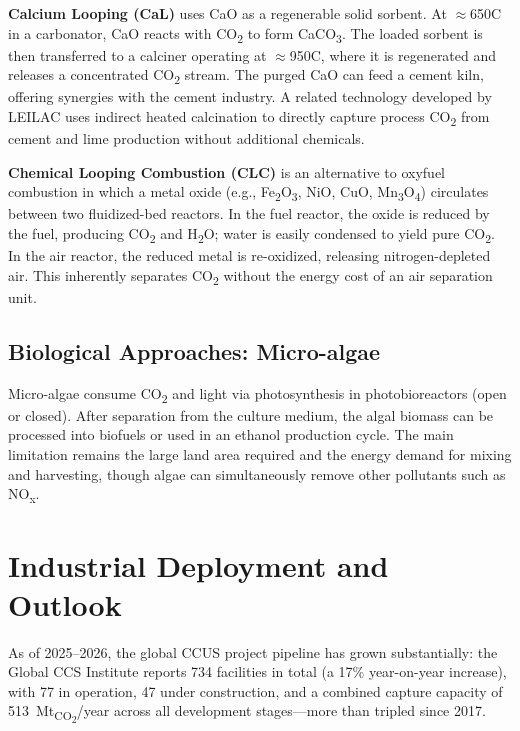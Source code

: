 \textbf{Calcium Looping (CaL)} uses CaO as a regenerable solid sorbent. At 
$\approx$650\textdegree C in a carbonator, CaO reacts with CO\textsubscript{2} to 
form CaCO\textsubscript{3}. The loaded sorbent is then transferred to a calciner 
operating at $\approx$950\textdegree C, where it is regenerated and releases a 
concentrated CO\textsubscript{2} stream. The purged CaO can feed a cement kiln, 
offering synergies with the cement industry. A related technology developed by 
LEILAC uses indirect heated calcination to directly capture process CO\textsubscript{2} 
from cement and lime production without additional chemicals.

\textbf{Chemical Looping Combustion (CLC)} is an alternative to oxyfuel combustion 
in which a metal oxide (e.g., Fe\textsubscript{2}O\textsubscript{3}, NiO, CuO, 
Mn\textsubscript{3}O\textsubscript{4}) circulates between two fluidized-bed reactors. 
In the fuel reactor, the oxide is reduced by the fuel, producing CO\textsubscript{2} 
and H\textsubscript{2}O; water is easily condensed to yield pure CO\textsubscript{2}. 
In the air reactor, the reduced metal is re-oxidized, releasing nitrogen-depleted air. 
This inherently separates CO\textsubscript{2} without the energy cost of an air 
separation unit.

\subsection{Biological Approaches: Micro-algae}

Micro-algae consume CO\textsubscript{2} and light via photosynthesis in photobioreactors 
(open or closed). After separation from the culture medium, the algal biomass can 
be processed into biofuels or used in an ethanol production cycle. The main limitation 
remains the large land area required and the energy demand for mixing and harvesting, 
though algae can simultaneously remove other pollutants such as NO\textsubscript{x}.

\section{Industrial Deployment and Outlook}

As of 2025--2026, the global CCUS project pipeline has grown substantially: the 
Global CCS Institute reports 734 facilities in total (a 17\% year-on-year increase), 
with 77 in operation, 47 under construction, and a combined capture capacity of 
513~Mt\textsubscript{CO\textsubscript{2}}/year across all development stages---more 
than tripled since 2017.

